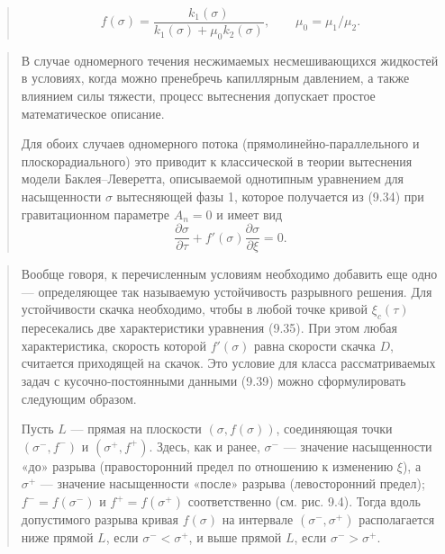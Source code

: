 \documentclass[12pt,a4paper]{article}
\begin{document}
\begin{quote}\sloppy
\begin{equation}f(\sigma)=\frac{k_1(\sigma)}{k_1(\sigma)+\mu_0k_2(\sigma)},\qquad\mu_0=\mu_1/\mu_2.\tag{9.22}\label{q12:eq-9-22}\end{equation}

\par\nobreak{}\par
\end{quote}

\begin{quote}\sloppy
В случае одномерного течения несжимаемых несмешивающихся жидкостей в условиях, когда можно пренебречь капиллярным давлением, а также влиянием силы тяжести, процесс вытеснения допускает простое математическое описание.

Для обоих случаев одномерного потока (прямолинейно-параллельного и плоскорадиального) это приводит к классической в теории вытеснения модели Баклея--Леверетта, описываемой однотипным уравнением для насыщенности $\sigma$ вытесняющей фазы 1, которое получается из (9.34) при гравитационном параметре $A_n=0$ и имеет вид
\begin{equation}\frac{\partial\sigma}{\partial\tau}+f'(\sigma)\frac{\partial\sigma}{\partial\xi}=0.\tag{9.35}\label{q12:eq-9-35}\end{equation}
\par\nobreak{}\par
\end{quote}

\begin{quote}\sloppy
Вообще говоря, к перечисленным условиям необходимо добавить еще одно --- определяющее так называемую устойчивость разрывного решения. Для устойчивости скачка необходимо, чтобы в любой точке кривой $\xi_c(\tau)$ пересекались две характеристики уравнения (9.35). При этом любая характеристика, скорость которой $f'(\sigma)$ равна скорости скачка $D$, считается приходящей на скачок. Это условие для класса рассматриваемых задач с кусочно-постоянными данными (9.39) можно сформулировать следующим образом.

Пусть $L$ --- прямая на плоскости $(\sigma,f(\sigma))$, соединяющая точки $(\sigma^-,f^-)$ и $(\sigma^+,f^+)$. Здесь, как и ранее, $\sigma^-$ --- значение насыщенности «до» разрыва (правосторонний предел по отношению к изменению $\xi$), а $\sigma^+$ --- значение насыщенности «после» разрыва (левосторонний предел); $f^-=f(\sigma^-)$ и $f^+=f(\sigma^+)$ соответственно (см.
рис. 9.4). Тогда вдоль допустимого разрыва кривая $f(\sigma)$ на интервале $(\sigma^-,\sigma^+)$ располагается ниже прямой $L$, если $\sigma^-<\sigma^+$, и выше прямой $L$, если $\sigma^->\sigma^+$.
\par\nobreak{}\par
\end{quote}
\end{document}
